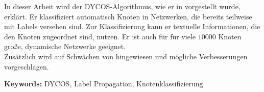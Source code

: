 In dieser Arbeit wird der DYCOS-Algorithmus, wie er in \cite{aggarwal2011} vorgestellt wurde, erklärt.
Er klassifiziert automatisch Knoten in 
Netzwerken, die bereits teilweise mit Labels versehen sind. Zur 
Klassifizierung kann er textuelle Informationen, die den Knoten 
zugeordnet sind, nutzen. Er ist auch für für viele $\num{10000}$ 
Knoten große, dynamische Netzwerke geeignet.\\
Zusätzlich wird auf Schwächen von \cite{aggarwal2011} hingewiesen
und mögliche Verbesserungen vorgeschlagen.

\textbf{Keywords:} DYCOS, Label Propagation, Knotenklassifizierung
